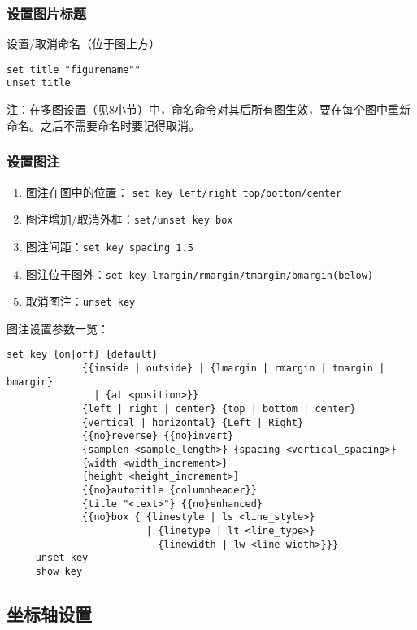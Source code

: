 \subsubsection{设置图片标题}
 设置/取消命名（位于图上方）
 \begin{verbatim}
set title "figurename""
unset title
\end{verbatim}
注：在多图设置（见8小节）中，命名命令对其后所有图生效，要在每个图中重新命名。之后不需要命名时要记得取消。


\subsubsection{设置图注}
\begin{enumerate}
\item 图注在图中的位置：
\verb*|set key left/right top/bottom/center|

\item 图注增加/取消外框：\verb*|set/unset key box|

\item 图注间距：\verb*|set key spacing 1.5|

\item 图注位于图外：\verb*|set key lmargin/rmargin/tmargin/bmargin(below)|

\item 取消图注：\verb*|unset key|
\end{enumerate}

图注设置参数一览：
\begin{verbatim}
set key {on|off} {default}
             {{inside | outside} | {lmargin | rmargin | tmargin | bmargin}
               | {at <position>}}
             {left | right | center} {top | bottom | center}
             {vertical | horizontal} {Left | Right}
             {{no}reverse} {{no}invert}
             {samplen <sample_length>} {spacing <vertical_spacing>}
             {width <width_increment>}
             {height <height_increment>}
             {{no}autotitle {columnheader}}
             {title "<text>"} {{no}enhanced}
             {{no}box { {linestyle | ls <line_style>}
                        | {linetype | lt <line_type>}
                          {linewidth | lw <line_width>}}}
     unset key
     show key
\end{verbatim}



\subsection{坐标轴设置}
